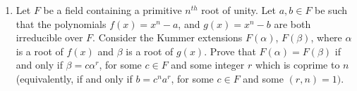 \documentclass[12pt,
psamsfonts]{amsart}
\theoremstyle{remark}
\theoremstyle{definition}
\newcommand{\R}{\mathbb{R}\xspace}
\newcommand{\Q}{\mathbb{Q}\xspace}
\newcommand{\F}{\mathbb{F}\xspace}
\DeclareMathOperator{\Aut}{Aut}
\DeclareMathOperator{\Gal}{Gal}
\numberwithin{equation}{section}
\begin{document}
\begin{enumerate}
\medskip
\medskip
\item Let $F$ be a field containing a primitive $n^{th}$ root of unity. Let $a,b\in F$ be such that the polynomials $f(x)=x^n-a$, and $g(x)=x^n-b$ are both irreducible over $F$. Consider the Kummer extensions $F(\alpha)$, $F(\beta)$, where $\alpha$ is a root of $f(x)$ and $\beta$ is a root of $g(x)$. Prove that 
$F(\alpha)=F(\beta)$ if and only if $\beta=c\alpha^r$, for some $c\in F$ and some integer $r$ which is coprime to $n$ (equivalently, if and only if $b=c^n a^r$, for some $c\in F$ and some $(r,n)=1)$. 
\\
%




\end{enumerate}
\end{document}
